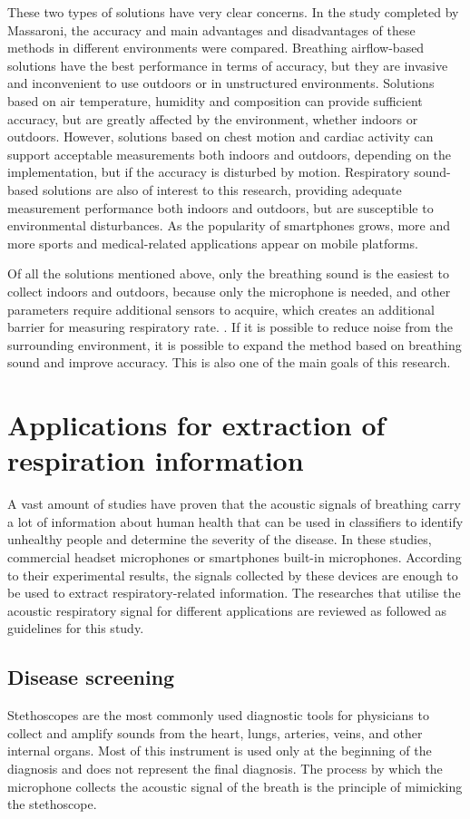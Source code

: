 These two types of solutions have very clear concerns. In the study completed by Massaroni, the accuracy and main advantages and disadvantages of these methods in different environments were compared. Breathing airflow-based solutions have the best performance in terms of accuracy, but they are invasive and inconvenient to use outdoors or in unstructured environments. Solutions based on air temperature, humidity and composition can provide sufficient accuracy, but are greatly affected by the environment, whether indoors or outdoors. However, solutions based on chest motion and cardiac activity can support acceptable measurements both indoors and outdoors, depending on the implementation, but if the accuracy is disturbed by motion. Respiratory sound-based solutions are also of interest to this research, providing adequate measurement performance both indoors and outdoors, but are susceptible to environmental disturbances. As the popularity of smartphones grows, more and more sports and medical-related applications appear on mobile platforms.

Of all the solutions mentioned above, only the breathing sound is the easiest to collect indoors and outdoors, because only the microphone is needed, and other parameters require additional sensors to acquire, which creates an additional barrier for measuring respiratory rate. . If it is possible to reduce noise from the surrounding environment, it is possible to expand the method based on breathing sound and improve accuracy. This is also one of the main goals of this research.


\section{Applications for extraction of respiration information}
A vast amount of studies have proven that the acoustic signals of breathing carry a lot of information about human health that can be used in classifiers to identify unhealthy people and determine the severity of the disease. In these studies, commercial headset microphones or smartphones built-in microphones. According to their experimental results, the signals collected by these devices are enough to be used to extract respiratory-related information. The researches that utilise the acoustic respiratory signal for different applications are reviewed as followed as guidelines for this study.

\subsection{Disease screening}
Stethoscopes are the most commonly used diagnostic tools for physicians to collect and amplify sounds from the heart, lungs, arteries, veins, and other internal organs. Most of this instrument is used only at the beginning of the diagnosis and does not represent the final diagnosis. The process by which the microphone collects the acoustic signal of the breath is the principle of mimicking the stethoscope.  

